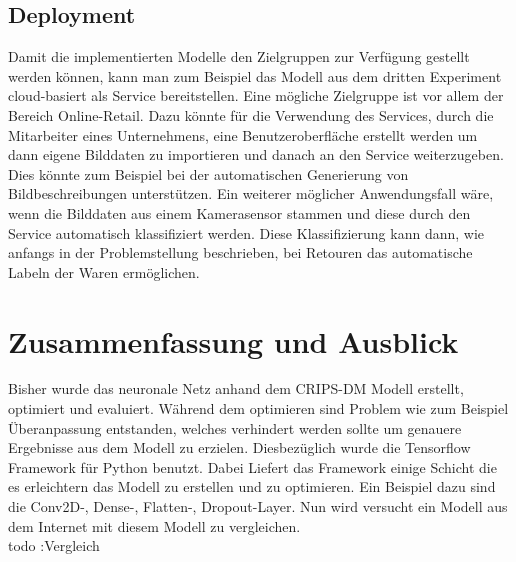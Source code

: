 \documentclass[12pt]{scrreprt}
\begin{document}
\newpage
\section{Deployment}\label{dp:dp}

Damit die implementierten Modelle den Zielgruppen zur Verfügung gestellt werden können, kann man zum Beispiel das Modell aus dem dritten Experiment cloud-basiert als Service bereitstellen. Eine mögliche Zielgruppe ist vor allem der Bereich Online-Retail. Dazu könnte für die Verwendung des Services, durch die Mitarbeiter eines Unternehmens, eine Benutzeroberfläche erstellt werden um dann eigene Bilddaten zu importieren und danach an den Service weiterzugeben. Dies könnte zum Beispiel bei der automatischen Generierung von Bildbeschreibungen unterstützen. Ein weiterer möglicher Anwendungsfall wäre, wenn die Bilddaten aus einem Kamerasensor stammen und diese durch den Service automatisch klassifiziert werden. Diese Klassifizierung kann dann, wie anfangs in der Problemstellung beschrieben, bei Retouren das automatische Labeln der Waren ermöglichen. 

\newpage
\chapter{Zusammenfassung und Ausblick}


Bisher wurde das neuronale Netz anhand dem CRIPS-DM Modell erstellt, optimiert und evaluiert. Während dem optimieren sind Problem wie zum Beispiel Überanpassung entstanden, welches verhindert werden sollte um genauere Ergebnisse aus dem Modell zu erzielen. Diesbezüglich wurde die Tensorflow Framework für Python benutzt. Dabei Liefert das Framework einige Schicht die es erleichtern das Modell zu erstellen und zu optimieren. Ein Beispiel dazu sind die Conv2D-, Dense-, Flatten-, Dropout-Layer. Nun wird versucht ein Modell aus dem Internet mit diesem Modell zu vergleichen.\\

todo :Vergleich\\
\end{document}
